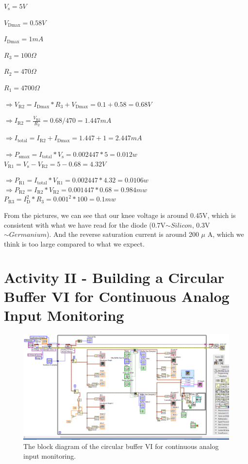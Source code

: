 \documentclass[11pt]{article}
\begin{document}
$V_{\mathrm {s} }=5 V$

$V_{\mathrm {Dmax} }=0.58 V$

$I_{\mathrm {Dmax} }=1 mA$

$R_{\mathrm {3} }=100 \Omega$

$R_{\mathrm {2} }=470 \Omega$

$R_{\mathrm {1} }=4700 \Omega$

$\Rightarrow V_{\mathrm {R2} }=I_{\mathrm {Dmax} }*R_{\mathrm {3} }+V_{\mathrm {Dmax} }=0.1+0.58=0.68 V$

$\Rightarrow I_{\mathrm {R2} }={\frac {V_{\mathrm {R2} }}{R_{\mathrm {2} }}}=0.68/470=1.447 mA $

$\Rightarrow I_{\mathrm {total} }=I_{\mathrm {R2} }+I_{\mathrm {Dmax} }=1.447+1=2.447 mA $

$\Rightarrow P_{\mathrm {smax} }=I_{\mathrm {total} }*V_{\mathrm {s} }=0.002447*5=0.012 w $ \\[1em]

$ V_{\mathrm {R1} }=V_{\mathrm {s} }-V_{\mathrm {R2} }=5-0.68=4.32 V $

$\Rightarrow P_{\mathrm {R1} }=I_{\mathrm {total} }*V_{\mathrm {R1} }=0.002447*4.32=0.0106 w $ \\[1em]

$\Rightarrow P_{\mathrm {R2} }=I_{\mathrm {R2} }*V_{\mathrm {R2} }=0.001447*0.68=0.984 mw $ \\[1em]

$P_{\mathrm {R3} }=I_{\mathrm {D} }^2*R_{\mathrm {3} }=0.001^2*100=0.1 mw $

From the pictures, we can see that our knee voltage is around 0.45V, which is consistent with what we have read for the diode (0.7V$\sim{Silicon}$, 0.3V$\sim{Germanium}$). And the reverse saturation current is around 200 $\mu$ A, which we think is too large compared to what we expect.



\section{Activity II - Building a Circular Buffer VI for Continuous Analog Input Monitoring}


\begin{figure}[H]
 \begin{center}
  \includegraphics[width=\linewidth/2]{act1bp}
  \caption{The block diagram of the circular buffer VI for continuous analog input monitoring.}
  \label{fig:act1bp}
 \end{center}
\end{figure}
\end{document}

